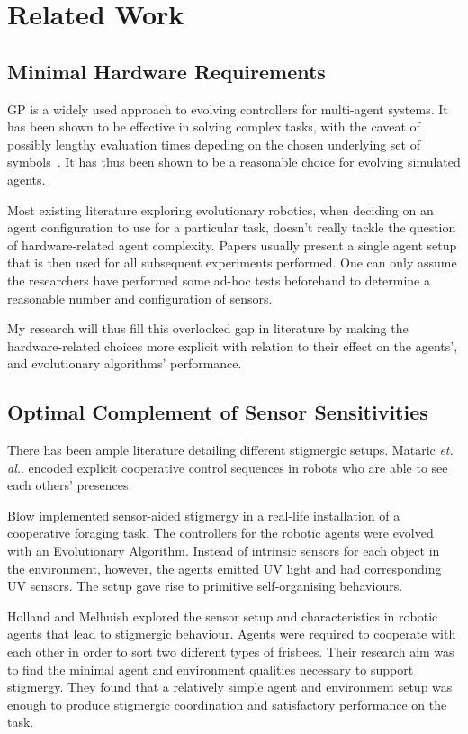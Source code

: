 \documentclass[a4paper,12pt]{article}
\begin{document}
\section{Related Work}

\subsection{Minimal Hardware Requirements}
GP is a widely used approach to evolving controllers for multi-agent systems. It has been shown to be effective in solving complex tasks, with the caveat of possibly lengthy evaluation times depeding on the chosen underlying set of symbols~\cite{gpchallenges,stgp}. It has thus been shown to be a reasonable choice for evolving simulated agents.

Most existing literature exploring evolutionary robotics, when deciding on an agent configuration to use for a particular task, doesn’t really tackle the question of hardware-related agent complexity. Papers usually present a single agent setup that is then used for all subsequent experiments performed\cite{Waibel09, Sims94}. One can only assume the researchers have performed some ad-hoc tests beforehand to determine a reasonable number and configuration of sensors.

My research will thus fill this overlooked gap in literature by making the hardware-related choices more explicit with relation to their effect on the agents’, and evolutionary algorithms’ performance.

\subsection{Optimal Complement of Sensor Sensitivities}

There has been ample literature detailing different stigmergic setups. Mataric \textit{et. al.}. encoded explicit cooperative control sequences in robots who are able to see each others’ presences. \cite{Werger99}

Blow \cite{Blow05} implemented sensor-aided stigmergy in a real-life installation of a cooperative foraging task. The controllers for the robotic agents were evolved with an Evolutionary Algorithm. Instead of intrinsic sensors for each object in the environment, however, the agents emitted UV light and had corresponding UV sensors. The setup gave rise to primitive self-organising behaviours.

Holland and Melhuish \cite{Holland99} explored the sensor setup and characteristics in robotic agents that lead to stigmergic behaviour. Agents were required to cooperate with each other in order to sort two different types of frisbees. Their research aim was to find the minimal agent and environment qualities necessary to support stigmergy. They found that a relatively simple agent and environment setup was enough to produce stigmergic coordination and satisfactory performance on the task.
\end{document}
